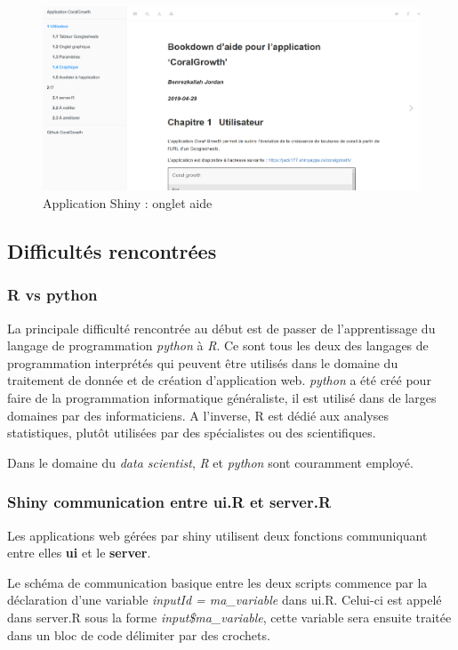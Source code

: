 \documentclass[]{article}
\begin{document}
\begin{figure}[h!]
\includegraphics[]{../image/aide.PNG}
\caption{Application Shiny : onglet aide}
\end{figure}

\subsection{Difficultés rencontrées}\label{difficultes-rencontrees}

\subsubsection{R vs python}\label{r-vs-python}

La principale difficulté rencontrée au début est de passer de
l'apprentissage du langage de programmation \emph{python} à \emph{R}. Ce
sont tous les deux des langages de programmation interprétés qui peuvent
être utilisés dans le domaine du traitement de donnée et de création
d'application web. \emph{python} a été créé pour faire de la
programmation informatique généraliste, il est utilisé dans de larges
domaines par des informaticiens. A l'inverse, R est dédié aux analyses
statistiques, plutôt utilisées par des spécialistes ou des
scientifiques.

Dans le domaine du \emph{data scientist}, \emph{R} et \emph{python} sont
couramment employé.

\subsubsection{Shiny communication entre ui.R et
server.R}\label{shiny-communication-entre-ui.r-et-server.r}

Les applications web gérées par shiny utilisent deux fonctions
communiquant entre elles \textbf{ui} et le \textbf{server}.

Le schéma de communication basique entre les deux scripts commence par
la déclaration d'une variable \emph{inputId = ma\_variable} dans ui.R.
Celui-ci est appelé dans server.R sous la forme
\emph{input\$ma\_variable}, cette variable sera ensuite traitée dans un
bloc de code délimiter par des crochets.
\end{document}
